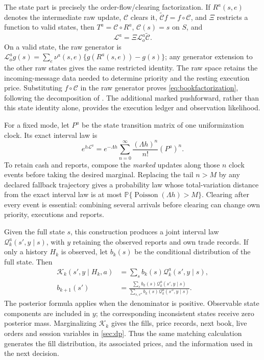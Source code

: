 \documentclass[11pt]{article}
\numberwithin{equation}{section}
\theoremstyle{definition}
\theoremstyle{remark}
\theoremstyle{definition}
\newcommand{\Pp}{\mathbb P}
\newcommand{\K}{\mathcal K}
\begin{document}
The state part is precisely the order-flow/clearing factorization. If
$R^a(s,e)$ denotes the intermediate raw update, $\mathcal C$ clears it,
$\widetilde{\mathcal C}f=f\circ\mathcal C$, and $\Xi$ restricts a function
to valid states, then $T^a=\mathcal C\circ R^a$, $\mathcal C(s)=s$ on
$S$, and
\begin{equation}\label{eq:bookfactorization}
 \mathscr L^a=\Xi\mathscr L_o^a\widetilde{\mathcal C}.
\end{equation}
On a valid state, the raw generator is
$\mathscr L_o^a g(s)=\sum_e\nu^a(s,e)\{g(R^a(s,e))-g(s)\}$;
any generator extension to the other raw states gives the same restricted
identity. The raw space retains the incoming-message data needed to determine
priority and the resting execution price. Substituting $f\circ\mathcal C$
in the raw generator proves \eqref{eq:bookfactorization}, following the
decomposition of \citet{contdegondxuan2025}. The additional marked
pushforward, rather than this state identity alone, provides the execution
ledger and observation likelihood.

For a fixed mode, let $P^a$ be the state transition matrix of one
uniformization clock. Its exact interval law is
\begin{equation}\label{eq:booksemigroup}
 e^{h\mathscr L^a}=
 e^{-\Lambda h}\sum_{n=0}^\infty
       \frac{(\Lambda h)^n}{n!}(P^a)^n.
\end{equation}
To retain cash and reports, compose the \emph{marked} updates along those
$n$ clock events before taking the desired marginal. Replacing the tail
$n>M$ by any declared fallback trajectory gives a probability law whose
total-variation distance from the exact interval law is at most
$\Pp\{\operatorname{Poisson}(\Lambda h)>M\}$. Clearing after every event
is essential: combining several arrivals before clearing can change own
priority, executions and reports.

Given the full state $s$, this construction produces a joint interval law
$\mathcal Q_k^a(s',y\mid s)$, with $y$ retaining the observed reports and
own trade records. If only a history $H_k$ is observed, let $b_k(s)$ be the
conditional distribution of the full state. Then
\begin{align}\label{eq:bookfilter}
 \K_k(s',y\mid H_k,a)&=\sum_s b_k(s)\mathcal Q_k^a(s',y\mid s),\\
 b_{k+1}(s')&=
 \frac{\sum_s b_k(s)\mathcal Q_k^a(s',y\mid s)}
 {\sum_{s,s''}b_k(s)\mathcal Q_k^a(s'',y\mid s)}.\nonumber
\end{align}
The posterior formula applies when the denominator is positive. Observable
state components are included in $y$; the corresponding inconsistent states
receive zero posterior mass. Marginalizing $\K_k$ gives the fills, price
records, next book, live orders and session variables in \cref{sec:dp}.
Thus the same matching calculation generates the fill distribution, its
associated prices, and the information used in the next decision.
\end{document}
